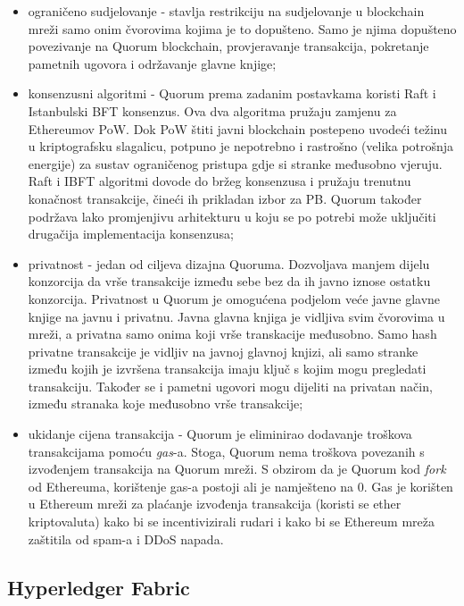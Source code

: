 \documentclass[times, utf8, diplomski]{fer}
\begin{document}
\begin{itemize}

\item ograničeno sudjelovanje - stavlja restrikciju na sudjelovanje u blockchain mreži samo onim čvorovima kojima je to dopušteno. Samo je njima dopušteno povezivanje na Quorum blockchain, provjeravanje transakcija, pokretanje pametnih ugovora i održavanje glavne knjige;

\item konsenzusni algoritmi - Quorum prema zadanim postavkama koristi Raft i Istanbulski BFT konsenzus. Ova dva algoritma pružaju zamjenu za Ethereumov PoW. Dok PoW štiti javni blockchain postepeno uvodeći težinu u kriptografsku slagalicu, potpuno je nepotrebno i rastrošno (velika potrošnja energije) za sustav ograničenog pristupa gdje si stranke međusobno vjeruju. Raft i IBFT algoritmi dovode do bržeg konsenzusa i pružaju trenutnu konačnost transakcije, čineći ih prikladan izbor za PB. Quorum također podržava lako promjenjivu arhitekturu u koju se po potrebi može uključiti drugačija implementacija konsenzusa;

\item privatnost - jedan od ciljeva dizajna Quoruma. Dozvoljava manjem dijelu konzorcija da vrše transakcije između sebe bez da ih javno iznose ostatku konzorcija. Privatnost u Quorum je omogućena podjelom veće javne glavne knjige na javnu i privatnu. Javna glavna knjiga je vidljiva svim čvorovima u mreži, a privatna samo onima koji vrše transkacije međusobno. Samo hash privatne transakcije je vidljiv na javnoj glavnoj knjizi, ali samo stranke između kojih je izvršena transakcija imaju ključ s kojim mogu pregledati transakciju. Također se i pametni ugovori mogu dijeliti na privatan način, između stranaka koje međusobno vrše transakcije;

\item ukidanje cijena transakcija - Quorum je eliminirao dodavanje troškova transakcijama pomoću \textit{gas}-a. Stoga, Quorum nema troškova povezanih s izvođenjem transakcija na Quorum mreži. S obzirom da je Quorum kod \textit{fork} od Ethereuma, korištenje gas-a postoji ali je namješteno na 0. Gas je korišten u Ethereum mreži za plaćanje izvođenja transakcija (koristi se ether kriptovaluta) kako bi se incentivizirali rudari i kako bi se Ethereum mreža zaštitila od spam-a i DDoS napada.

\end{itemize}

\subsection{Hyperledger Fabric}
\end{document}
